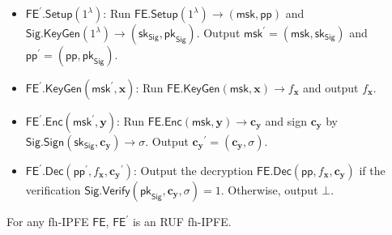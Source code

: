 \begin{itemize}

	\item $\textsf{FE}^\prime \textsf{.Setup}(1^\lambda)$: Run $\textsf{FE.Setup}(1^\lambda) \to (\textsf{msk}, \textsf{pp})$ and $\textsf{Sig.KeyGen}(1^\lambda) \to (\textsf{sk}_{\textsf{Sig}}, \textsf{pk}_{\textsf{Sig}} )$. Output $\textsf{msk}^\prime = (\textsf{msk}, \textsf{sk}_\textsf{Sig})$ and $\textsf{pp}^\prime = (\textsf{pp}, \textsf{pk}_{\textsf{Sig}})$.

	\item $\textsf{FE}^\prime \textsf{.KeyGen}(\textsf{msk}^\prime, \mathbf{x})$: Run $\textsf{FE.KeyGen}(\textsf{msk}, \mathbf{x}) \to f_\mathbf{x}$ and output $f_\mathbf{x}$.

	\item $\textsf{FE}^\prime \textsf{.Enc}(\textsf{msk}^\prime, \mathbf{y})$: Run $\textsf{FE.Enc}(\textsf{msk}, \mathbf{y}) \to \mathbf{c_y}$ and sign $\mathbf{c_y}$ by $\textsf{Sig.Sign}(\textsf{sk}_{\textsf{Sig}}, \mathbf{c_y}) \to \sigma$. Output $\mathbf{c_y}^\prime = (\mathbf{c_y}, \sigma)$.

	\item $\textsf{FE}^\prime \textsf{.Dec}(\textsf{pp}^\prime, f_\mathbf{x}, \mathbf{c_y}^\prime )$: Output the decryption $\textsf{FE.Dec}(\textsf{pp}, f_\mathbf{x}, \mathbf{c_y})$ if the verification $\textsf{Sig.Verify}(\textsf{pk}_{\textsf{Sig}}, \mathbf{c_y}, \sigma ) = 1$. Otherwise, output $\bot$.

\end{itemize}

\begin{theorem}

For any fh-IPFE $\textsf{FE}$, $\textsf{FE}^\prime$ is an RUF fh-IPFE.

\end{theorem}


